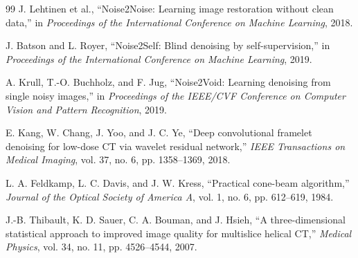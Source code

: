 \begin{thebibliography}{99}
     J. Lehtinen et al., ``Noise2Noise: Learning image restoration without clean data,'' in \textit{Proceedings of the International Conference on Machine Learning}, 2018.

     J. Batson and L. Royer, ``Noise2Self: Blind denoising by self-supervision,'' in \textit{Proceedings of the International Conference on Machine Learning}, 2019.

     A. Krull, T.-O. Buchholz, and F. Jug, ``Noise2Void: Learning denoising from single noisy images,'' in \textit{Proceedings of the IEEE/CVF Conference on Computer Vision and Pattern Recognition}, 2019.

     E. Kang, W. Chang, J. Yoo, and J. C. Ye, ``Deep convolutional framelet denoising for low-dose CT via wavelet residual network,'' \textit{IEEE Transactions on Medical Imaging}, vol. 37, no. 6, pp. 1358--1369, 2018.

     L. A. Feldkamp, L. C. Davis, and J. W. Kress, ``Practical cone-beam algorithm,'' \textit{Journal of the Optical Society of America A}, vol. 1, no. 6, pp. 612--619, 1984.

     J.-B. Thibault, K. D. Sauer, C. A. Bouman, and J. Hsieh, ``A three-dimensional statistical approach to improved image quality for multislice helical CT,'' \textit{Medical Physics}, vol. 34, no. 11, pp. 4526--4544, 2007.

\end{thebibliography}
\doublespacing
